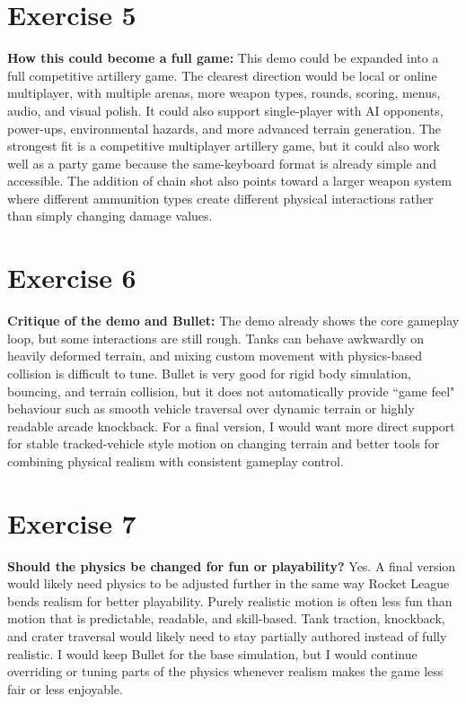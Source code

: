 \documentclass[12pt]{article}
\begin{document}
\section*{Exercise 5}
\textbf{How this could become a full game:} This demo could be expanded into a full competitive artillery game. The clearest direction would be local or online multiplayer, with multiple arenas, more weapon types, rounds, scoring, menus, audio, and visual polish. It could also support single-player with AI opponents, power-ups, environmental hazards, and more advanced terrain generation. The strongest fit is a competitive multiplayer artillery game, but it could also work well as a party game because the same-keyboard format is already simple and accessible. The addition of chain shot also points toward a larger weapon system where different ammunition types create different physical interactions rather than simply changing damage values.

\section*{Exercise 6}
\textbf{Critique of the demo and Bullet:} The demo already shows the core gameplay loop, but some interactions are still rough. Tanks can behave awkwardly on heavily deformed terrain, and mixing custom movement with physics-based collision is difficult to tune. Bullet is very good for rigid body simulation, bouncing, and terrain collision, but it does not automatically provide ``game feel" behaviour such as smooth vehicle traversal over dynamic terrain or highly readable arcade knockback. For a final version, I would want more direct support for stable tracked-vehicle style motion on changing terrain and better tools for combining physical realism with consistent gameplay control.

\section*{Exercise 7}
\textbf{Should the physics be changed for fun or playability?} Yes. A final version would likely need physics to be adjusted further in the same way Rocket League bends realism for better playability. Purely realistic motion is often less fun than motion that is predictable, readable, and skill-based. Tank traction, knockback, and crater traversal would likely need to stay partially authored instead of fully realistic. I would keep Bullet for the base simulation, but I would continue overriding or tuning parts of the physics whenever realism makes the game less fair or less enjoyable.
\end{document}
